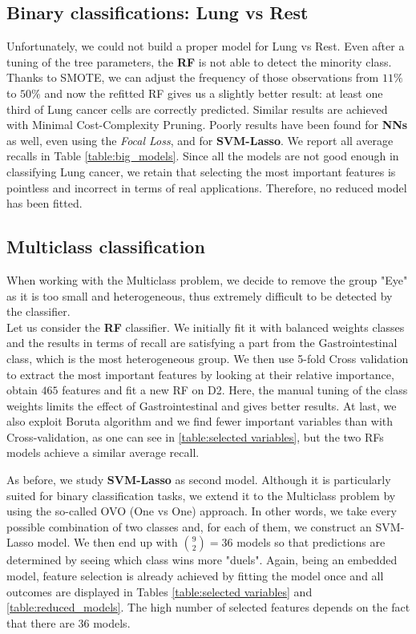 \documentclass[a4paper,11pt, oneside]{article}  %
\begin{document}
\subsection{Binary classifications: Lung vs Rest}
Unfortunately,  we could not build a proper model for Lung vs Rest.  Even after a tuning of the tree parameters,  the \textbf{RF} is not able to detect the minority class.  Thanks to SMOTE, we can adjust the frequency of those observations from $11\%$ to $50\%$ and now the refitted RF gives us a slightly better result: at least one third of Lung cancer cells are correctly predicted.  Similar results are achieved with Minimal Cost-Complexity Pruning. Poorly results have been found for \textbf{NNs} as well,  even using the \textit{Focal Loss}, and for \textbf{SVM-Lasso}. We report all average recalls in Table \ref{table:big_models}.  Since all the models are not good enough in classifying Lung cancer, we retain that selecting the most important features is pointless and incorrect in terms of real applications. Therefore, no reduced model has been fitted.

\subsection{Multiclass classification}
When working with the Multiclass problem, we decide to remove the group "Eye" as it is too small and heterogeneous,  thus extremely difficult to be detected by the classifier.  \\

Let us consider the \textbf{RF}  classifier. We initially fit it with balanced weights classes and the results in terms of recall are satisfying a part from the Gastrointestinal class,  which is the most heterogeneous group.  We then use 5-fold Cross validation to extract the most important features by looking at their relative importance,  obtain $465$ features and fit a new RF on D2.  Here,  the manual tuning of the class weights limits the effect of Gastrointestinal and gives better results.  At last, we also exploit Boruta algorithm and we find fewer important variables than with Cross-validation,  as one can see in \ref{table:selected variables},  but the two RFs models achieve a similar average recall.

As before, we study \textbf{SVM-Lasso} as second model.  Although it is particularly suited for binary classification tasks, we extend it to the Multiclass problem by using the so-called OVO (One vs One) approach. In other words, we take every possible combination of two classes and, for each of them, we construct an SVM-Lasso model. We then end up with $ \binom{9}{2} = 36$ models so that predictions are determined by seeing which class wins more "duels". Again,  being an embedded model, feature selection is already achieved by fitting the model once and all outcomes are displayed in Tables \ref{table:selected variables} and \ref{table:reduced_models}. The high number of selected features depends on the fact that there are 36 models.  
\end{document}
